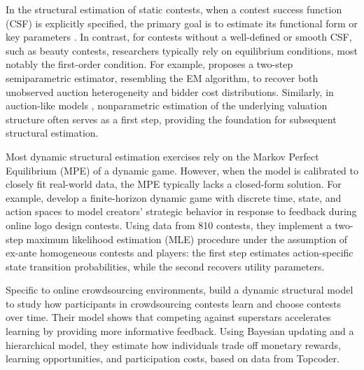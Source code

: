 \documentclass[mnsc]{informs3}
\begin{document}
In the structural estimation of static contests, when a contest success function (CSF) is explicitly specified, the primary goal is to estimate its functional form or key parameters \citep{hwang2012technology, kang2016policy, huang2021structural}.
In contrast, for contests without a well-defined or smooth CSF, such as beauty contests, researchers typically rely on equilibrium conditions, most notably the first-order condition.
For example, \citet{yoganarasimhan2016estimation} proposes a two-step semiparametric estimator, resembling the EM algorithm, to recover both unobserved auction heterogeneity and bidder cost distributions.
Similarly, in auction-like models \citep{guerre2000optimal, shakhgildyan2022nonparametric}, nonparametric estimation of the underlying valuation structure often serves as a first step, providing the foundation for subsequent structural estimation.

Most dynamic structural estimation exercises rely on the Markov Perfect Equilibrium (MPE) of a dynamic game.
However, when the model is calibrated to closely fit real-world data, the MPE typically lacks a closed-form solution.
For example, \citet{jiang2022feedback} develop a finite-horizon dynamic game with discrete time, state, and action spaces to model creators’ strategic behavior in response to feedback during online logo design contests.
Using data from 810 contests, they implement a two-step maximum likelihood estimation (MLE) procedure under the assumption of ex-ante homogeneous contests and players: the first step estimates action-specific state transition probabilities, while the second recovers utility parameters.

Specific to online crowdsourcing environments,
\citet{zhang2019structural} build a dynamic structural model to study how participants in crowdsourcing contests learn and choose contests over time.
Their model shows that competing against superstars accelerates learning by providing more informative feedback.
Using Bayesian updating and a hierarchical model, they estimate how individuals trade off monetary rewards, learning opportunities, and participation costs, based on data from Topcoder.
\end{document}
